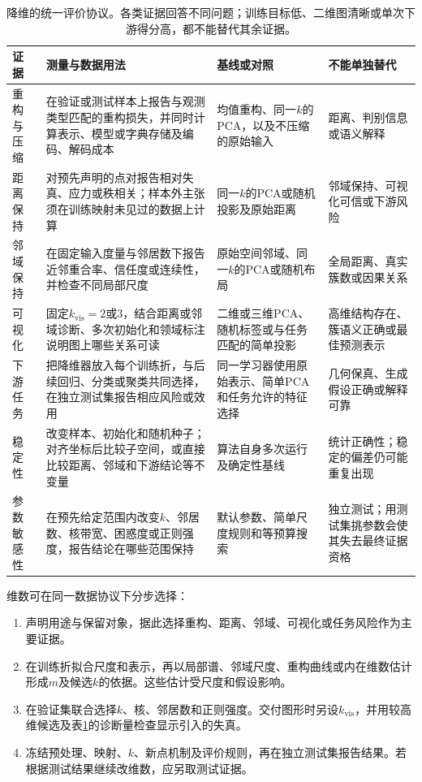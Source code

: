 \begin{table}[!htbp]
  \centering
  \small
  \begin{tabularx}{\linewidth}{@{}>{\RaggedRight\arraybackslash}p{23mm}>{\RaggedRight\arraybackslash}p{58mm}>{\RaggedRight\arraybackslash}X>{\RaggedRight\arraybackslash}X@{}}
    \toprule
    证据 & 测量与数据用法 & 基线或对照 & 不能单独替代 \\
    \midrule
    重构与压缩
      & 在验证或测试样本上报告与观测类型匹配的重构损失，并同时计算表示、模型或字典存储及编码、解码成本
      & 均值重构、同一$k$的PCA，以及不压缩的原始输入
      & 距离、判别信息或语义解释 \\
    距离保持
      & 对预先声明的点对报告相对失真、应力或秩相关；样本外主张须在训练映射未见过的数据上计算
      & 同一$k$的PCA或随机投影及原始距离
      & 邻域保持、可视化可信或下游风险 \\
    邻域保持
      & 在固定输入度量与邻居数下报告近邻重合率、信任度或连续性，并检查不同局部尺度
      & 原始空间邻域、同一$k$的PCA或随机布局
      & 全局距离、真实簇数或因果关系 \\
    可视化
      & 固定$k_{\mathrm{vis}}=2$或$3$，结合距离或邻域诊断、多次初始化和领域标注说明图上哪些关系可读
      & 二维或三维PCA、随机标签或与任务匹配的简单投影
      & 高维结构存在、簇语义正确或最佳预测表示 \\
    下游任务
      & 把降维器放入每个训练折，与后续回归、分类或聚类共同选择，在独立测试集报告相应风险或效用
      & 同一学习器使用原始表示、简单PCA和任务允许的特征选择
      & 几何保真、生成假设正确或解释可靠 \\
    稳定性
      & 改变样本、初始化和随机种子；对齐坐标后比较子空间，或直接比较距离、邻域和下游结论等不变量
      & 算法自身多次运行及确定性基线
      & 统计正确性；稳定的偏差仍可能重复出现 \\
    参数敏感性
      & 在预先给定范围内改变$k$、邻居数、核带宽、困惑度或正则强度，报告结论在哪些范围保持
      & 默认参数、简单尺度规则和等预算搜索
      & 独立测试；用测试集挑参数会使其失去最终证据资格 \\
    \bottomrule
  \end{tabularx}
  \caption{降维的统一评价协议。各类证据回答不同问题；训练目标低、二维图清晰或单次下游得分高，都不能替代其余证据。}
  \label{tab:dim-evaluation-protocol}
\end{table}

维数可在同一数据协议下分步选择：
\begin{enumerate}
  \item 声明用途与保留对象，据此选择重构、距离、邻域、可视化或任务风险作为主要证据。
  \item 在训练折拟合尺度和表示，再以局部谱、邻域尺度、重构曲线或内在维数估计形成$m$及候选$k$的依据。这些估计受尺度和假设影响。
  \item 在验证集联合选择$k$、核、邻居数和正则强度。交付图形时另设$k_{\mathrm{vis}}$，并用较高维候选及表\ref{tab:dim-evaluation-protocol}的诊断量检查显示引入的失真。
  \item 冻结预处理、映射、$k$、新点机制及评价规则，再在独立测试集报告结果。若根据测试结果继续改维数，应另取测试证据。
\end{enumerate}

